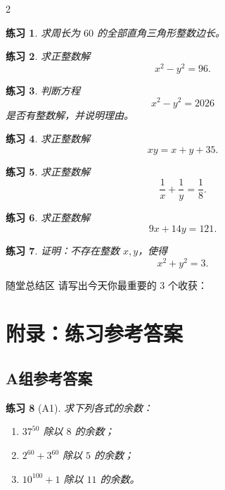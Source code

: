 \documentclass[11pt,a4paper,fontset=fandol]{ctexart}
\theoremstyle{formaltheorem}
\theoremstyle{formalexample}
\newtheorem{exercise}{练习}[section]
\newcommand{\classblank}{\vspace{2.2cm}}
\newcommand{\smallblank}{\vspace{1.2cm}}
\begin{document}
\begin{multicols}{2}
\begin{exercise}
求周长为 $60$ 的全部直角三角形整数边长。
\end{exercise}
\smallblank

\begin{exercise}
求正整数解
\[
x^2-y^2=96.
\]
\end{exercise}
\smallblank

\begin{exercise}
判断方程
\[
x^2-y^2=2026
\]
是否有整数解，并说明理由。
\end{exercise}
\smallblank

\begin{exercise}
求正整数解
\[
xy=x+y+35.
\]
\end{exercise}
\smallblank

\begin{exercise}
求正整数解
\[
\frac1x+\frac1y=\frac18.
\]
\end{exercise}
\smallblank

\begin{exercise}
求正整数解
\[
9x+14y=121.
\]
\end{exercise}
\smallblank

\begin{exercise}
证明：不存在整数 $x,y$，使得
\[
x^2+y^2=3.
\]
\end{exercise}
\smallblank

\end{multicols}

\begin{notebox}{随堂总结区}
请写出今天你最重要的 3 个收获：
\classblank
\end{notebox}

\newpage
\appendix
\section{附录：练习参考答案}

\subsection{A组参考答案}

\begin{exercise}[A1]
求下列各式的余数：
\begin{enumerate}
  \item $37^{50}$ 除以 $8$ 的余数；
  \item $2^{60}+3^{60}$ 除以 $5$ 的余数；
  \item $10^{100}+1$ 除以 $11$ 的余数。
\end{enumerate}
\end{exercise}
\end{document}
